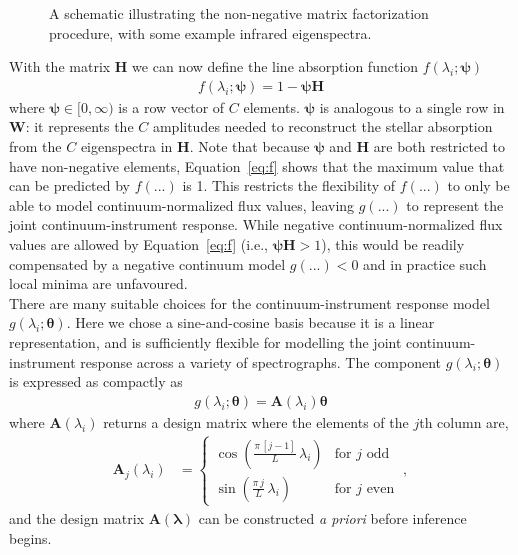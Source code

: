 \documentclass[modern]{aastex631}
\renewcommand{\vec}[1]{\mathbf{#1}}
\newcommand{\vectheta}{\boldsymbol{\theta}}
\newcommand{\vecpsi}{\boldsymbol{\psi}}
\newcommand{\vecW}{\mathbf{W}}
\newcommand{\vecH}{\mathbf{H}}
\begin{document}
\begin{figure*}
    \caption{A schematic illustrating the non-negative matrix factorization procedure, with some example infrared eigenspectra. \label{fig:schematic}}
\end{figure*}

\noindent{}With the matrix $\vec{H}$ we can now define the line absorption function $f(\lambda_i;\vecpsi)$ 
\begin{align}
    f(\lambda_i;\vecpsi) = 1 - \vecpsi\vecH \label{eq:f}
\end{align}
where $\vecpsi \in [0, \infty)$ is a row vector of $C$ elements. $\vecpsi$ is analogous to a single row in $\vecW$: it represents the $C$ amplitudes needed to reconstruct the stellar absorption from the $C$ eigenspectra in $\vecH$. Note that because $\vecpsi$ and $\vecH$ are both restricted to have non-negative elements, Equation~\ref{eq:f} shows that the maximum value that can be predicted by $f(...)$ is 1. This restricts the flexibility of $f(...)$ to only be able to model continuum-normalized flux values, leaving $g(...)$ to represent the joint continuum-instrument response. While negative continuum-normalized flux values are allowed by Equation~\ref{eq:f} (i.e., $\vecpsi\vecH > 1$), this would be readily compensated by a negative continuum model $g(...) < 0$ and in practice such local minima are unfavoured.\\

There are many suitable choices for the continuum-instrument response model $g(\lambda_i;\vectheta)$. Here we chose a sine-and-cosine basis because it is a linear representation, and is sufficiently flexible for modelling the joint continuum-instrument response across a variety of spectrographs. The component $g(\lambda_i;\vectheta)$ is expressed as compactly as
\begin{align}
    g(\lambda_i;\vectheta) = \vec{A}(\lambda_i)\vectheta
\end{align}
where $\vec{A}(\lambda_i)$ returns a design matrix where the elements of the $j$th column are,
\begin{align}
    \vec{A}_{j}(\lambda_i) & = \left\{\begin{array}{cl}\displaystyle\cos\left(\frac{\pi\,[j-1]}{L}\,\lambda_i\right) & \mbox{for $j$ odd} \\[3ex]
                                       \displaystyle\sin\left(\frac{\pi\,j}{L}\,\lambda_i\right) & \mbox{for $j$ even}\end{array}\right. ~,
\end{align}
\noindent{}and the design matrix $\vec{A}(\vec{\lambda})$ can be constructed \emph{a priori} before inference begins.\\
\end{document}
